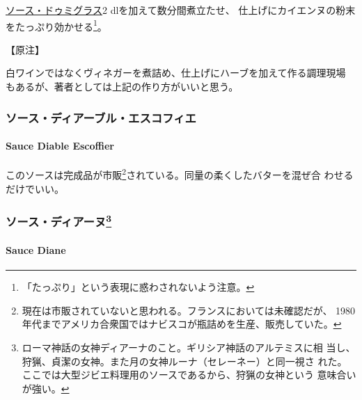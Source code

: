 \begin{recette}
\protect\hyperlink{sauce-demi-glace}{ソース・ドゥミグラス}2
dlを加えて数分間煮立たせ、
仕上げにカイエンヌの粉末をたっぷり効かせる\footnote{「たっぷり」という表現に惑わされないよう注意。}。

【原注】

白ワインではなくヴィネガーを煮詰め、仕上げにハーブを加えて作る調理現場
もあるが、著者としては上記の作り方がいいと思う。

\maeaki

\hypertarget{ux30bdux30fcux30b9ux30c7ux30a3ux30a2ux30fcux30d6ux30ebux30a8ux30b9ux30b3ux30d5ux30a3ux30a8}{%
\subsubsection{ソース・ディアーブル・エスコフィエ}\label{ux30bdux30fcux30b9ux30c7ux30a3ux30a2ux30fcux30d6ux30ebux30a8ux30b9ux30b3ux30d5ux30a3ux30a8}}

\hypertarget{sauce-diable-escoffier}{%
\paragraph{Sauce Diable Escoffier}\label{sauce-diable-escoffier}}

   

このソースは完成品が市販\footnote{現在は市販されていないと思われる。フランスにおいては未確認だが、
  1980年代までアメリカ合衆国ではナビスコが瓶詰めを生産、販売していた。}されている。同量の柔くしたバターを混ぜ合
わせるだけでいい。

\maeaki

\hypertarget{ux30bdux30fcux30b9ux30c7ux30a3ux30a2ux30fcux30cc28}{%
\subsubsection[ソース・ディアーヌ]{\texorpdfstring{ソース・ディアーヌ\footnote{ローマ神話の女神ディアーナのこと。ギリシア神話のアルテミスに相
  当し、狩猟、貞潔の女神。また月の女神ルーナ（セレーネー）と同一視さ
  れた。ここでは大型ジビエ料理用のソースであるから、狩猟の女神という
  意味合いが強い。}}{ソース・ディアーヌ}}\label{ux30bdux30fcux30b9ux30c7ux30a3ux30a2ux30fcux30cc28}}

\hypertarget{sauce-diane}{%
\paragraph{Sauce Diane}\label{sauce-diane}}


\end{recette}

